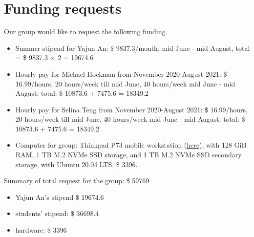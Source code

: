 \documentclass[12pt]{article}
\begin{document}
\section*{Funding requests}
Our group would like to request the following funding.

\begin{itemize}
\item Summer stipend for Yajun An: \$ 9837.3/month,  mid June - mid August, total = \$ 9837.3 $\times $ 2 = 19674.6%

\item Hourly pay for Michael Hockman from November 2020-August 2021: \$ 16.99/hours, 20 hours/week till mid June, 40 hours/week mid June - mid August; total: \$ 10873.6 + 7475.6 = 18349.2

\item Hourly pay for Selina Teng from November 2020-August 2021: \$ 16.99/hours, 20 hours/week till mid June, 40 hours/week mid June - mid August; total: \$ 10873.6 + 7475.6 = 18349.2

\item Computer for group: Thinkpad P73 mobile workstation (\href{https://shop.lacpdx.com/thinkpad-p73/}{here}), with 128 GiB RAM, 1 TB M.2 NVMe SSD storage, and 1 TB M.2 NVMe SSD secondary storage, with Ubuntu 20.04 LTS, \$ 3396.
\end{itemize}

\noindent Summary of total request for the group: \$ 59769
\begin{itemize}
\item Yajun An's stipend \$ 19674.6
\item students' stipend: \$ 36698.4
\item hardware: \$ 3396
\end{itemize}

\newpage
\end{document}
